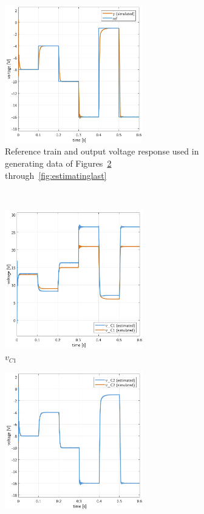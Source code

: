 \begin{figure}[H]
    \begin{framed}
    \captionsetup[subfigure]{justification = centering}
    \centering
    \begin{subfigure}[b]{0.8\textwidth}
    \centering\includegraphics[height = 6cm]{figures/estimation/ref_y_pulsetrain.pdf}
    \caption{Reference train and output voltage response used in generating data of Figures~\ref{fig:estimatingfirst} through~\ref{fig:estimatinglast}}
    \label{}
    \end{subfigure}
    \\[11pt]
    \begin{subfigure}[b]{0.45\textwidth}
    \centering
    \includegraphics[height = 6cm]{figures/estimation/vC1_vC1.pdf}
    \caption{$v_{C1}$}
    \label{fig:estimatingfirst}
    \end{subfigure}
    \hfill
    \begin{subfigure}[b]{0.45\textwidth}
    \centering
    \includegraphics[height = 6cm]{figures/estimation/vC2_vC2.pdf}

\end{subfigure}
\end{framed}
\end{figure}
